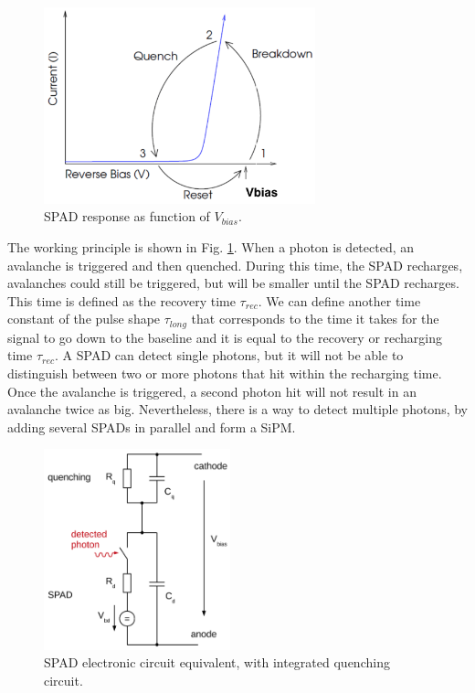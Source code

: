 \begin{figure}[htbp]
 \centering
\includegraphics[width=0.7\textwidth]{gfx/documentation/switch_analogy.png}
 \caption{SPAD response as function of $V_{bias}$. 
 \cite{Onsemi2021IntroductionMultipliers}
 }
\label{fig:chapter02:Diodes and photo-diodes:switch}
\end{figure}
The working principle is shown in Fig. \ref{fig:chapter02:Diodes and photo-diodes:switch}. 
When a photon is detected, an avalanche is triggered and then quenched. During this time, the SPAD recharges, avalanches could still be triggered, but will be smaller until the SPAD recharges. This time is defined as the recovery time $\tau_{rec}$. We can define another time constant of the pulse shape $\tau_{long}$ that corresponds to the time it takes for the signal to go down to the baseline and it is equal to the recovery or recharging time $\tau_{rec}$. A SPAD can detect single photons, but it will not be able to distinguish between two or more photons that hit within the recharging time. Once the avalanche is triggered, a second photon hit will not result in an avalanche twice as big. Nevertheless, there is a way to detect multiple photons, by adding several SPADs in parallel and form a SiPM.  
\begin{figure}[htbp]
    \centering
    \includegraphics[width=0.48\textwidth]{gfx/documentation/spad_circuit.png}
    \caption{SPAD electronic circuit equivalent, with integrated quenching circuit. 
    \cite{Gundacker2020TheDetector}}
\end{figure}


